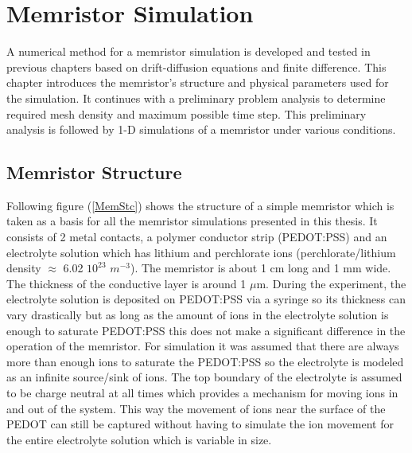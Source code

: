 
\chapter{Memristor Simulation} %

\label{Chapter5} %


\begin{doublespace}

A numerical method for a memristor simulation is developed and tested in previous chapters based on drift-diffusion equations and finite difference. This chapter introduces the memristor's structure and physical parameters used for the simulation. It continues with a preliminary problem analysis to determine required mesh density and maximum possible time step. This preliminary analysis is followed by 1-D simulations of a memristor under various conditions.


\section{Memristor Structure}

Following figure (\ref{MemStc}) shows the structure of a simple memristor which is taken as a basis for all the memristor simulations presented in this thesis. It consists of 2 metal contacts, a polymer conductor strip (PEDOT:PSS) and an electrolyte solution which has lithium and perchlorate ions (perchlorate/lithium density $\approx$ 6.02 $10^{23}$ $m^{-3}$). The memristor is about 1 cm long and 1 mm wide. The thickness of the conductive layer is around 1 $\mu$m. During the experiment, the electrolyte solution is deposited on PEDOT:PSS via a syringe so its thickness can vary drastically but as long as the amount of ions in the electrolyte solution is enough to saturate PEDOT:PSS this does not make a significant difference in the operation of the memristor. For simulation it was assumed that there are always more than enough ions to saturate the PEDOT:PSS so the electrolyte is modeled as an infinite source/sink of ions. The top boundary of the electrolyte is assumed to be charge neutral at all times which provides a mechanism for moving ions in and out of the system. This way the movement of ions near the surface of the PEDOT can still be captured without having to simulate the ion movement for the entire electrolyte solution which is variable in size. 


\end{doublespace}
